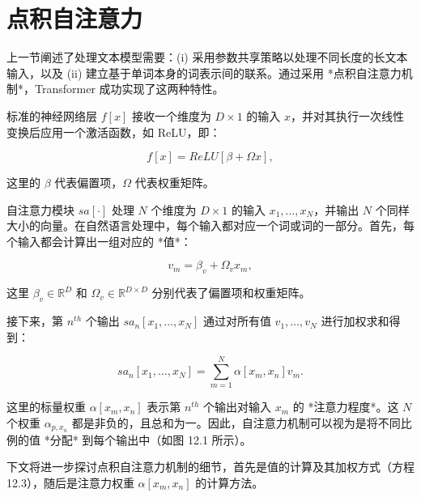 \documentclass[lang=cn,newtx,10pt,scheme=chinese]{elegantbook}
\begin{document}
\section{点积自注意力}
上一节阐述了处理文本模型需要：(i) 采用参数共享策略以处理不同长度的长文本输入，以及 (ii) 建立基于单词本身的词表示间的联系。通过采用 *点积自注意力机制*，Transformer 成功实现了这两种特性。

标准的神经网络层 \(f[x]\) 接收一个维度为 \(D \times 1\) 的输入 \(x\)，并对其执行一次线性变换后应用一个激活函数，如 ReLU，即：

\begin{equation}
f[x] = ReLU[\beta + \Omega x], 
\end{equation}

这里的 \(\beta\) 代表偏置项，\(\Omega\) 代表权重矩阵。

自注意力模块 \(sa[\cdot]\) 处理 \(N\) 个维度为 \(D \times 1\) 的输入 \(x_1, \ldots, x_N\)，并输出 \(N\) 个同样大小的向量。在自然语言处理中，每个输入都对应一个词或词的一部分。首先，每个输入都会计算出一组对应的 *值*：

\begin{equation}
v_m = \beta_v + \Omega_vx_m, 
\end{equation}

这里 \(\beta_v \in \mathbb{R}^D\) 和 \(\Omega_v \in \mathbb{R}^{D \times D}\) 分别代表了偏置项和权重矩阵。

接下来，第 \(n^{th}\) 个输出 \(sa_n[x_1, \ldots, x_N]\) 通过对所有值 \(v_1, \ldots, v_N\) 进行加权求和得到：

\begin{equation}
sa_n[x_1, \ldots, x_N] = \sum_{m=1}^N \alpha[x_m, x_n]v_m. 
\end{equation}

这里的标量权重 \(\alpha[x_m, x_n]\) 表示第 \(n^{th}\) 个输出对输入 \(x_m\) 的 *注意力程度*。这 \(N\) 个权重 \(\alpha_{p, x_n}\) 都是非负的，且总和为一。因此，自注意力机制可以视为是将不同比例的值 *分配* 到每个输出中（如图 12.1 所示）。

下文将进一步探讨点积自注意力机制的细节，首先是值的计算及其加权方式（方程 12.3），随后是注意力权重 \(\alpha[x_m, x_n]\) 的计算方法。
\end{document}
